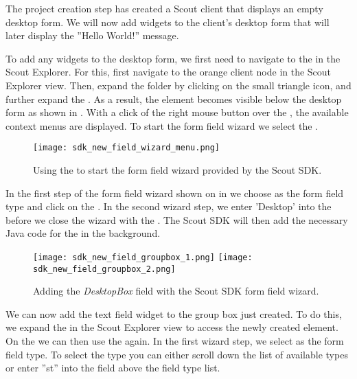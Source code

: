 %

The project creation step has created a Scout client that displays an empty desktop form.
We will now add widgets to the client's desktop form that will later display the ''Hello World!'' message.

To add any widgets to the desktop form, we first need to navigate to the  in the Scout Explorer.
For this, first navigate to the orange client node in the Scout Explorer view.
Then, expand the  folder by clicking on the small triangle icon, and further expand the . 
As a result, the  element becomes visible below the desktop form as shown in . 
With a click of the right mouse button over the , the available context menus are displayed.
To start the form field wizard we select the .

\begin{figure}
\texttt{[image: sdk\_new\_field\_wizard\_menu.png]} 
\caption{Using the  to start the form field wizard provided by the Scout SDK.}
\end{figure}

In the first step of the form field wizard shown on in  we choose  as the form field type and click on the .
In the second wizard step, we enter 'Desktop' into the  before we close the wizard with the .
The Scout SDK will then add the necessary Java code for the  in the background.

\begin{figure}
\texttt{[image: sdk\_new\_field\_groupbox\_1.png]} \hspace{8mm}
\texttt{[image: sdk\_new\_field\_groupbox\_2.png]}
\caption{Adding the \textit{DesktopBox} field with the Scout SDK form field wizard.}
\end{figure}

We can now add the text field widget to the group box just created.
To do this, we expand the  in the Scout Explorer view to access the newly created  element. 
On the  we can then use the  again.
In the first wizard step, we select  as the form field type. 
To select the  type you can either scroll down the list of available types or enter ''st'' into the field above the field type list. 

